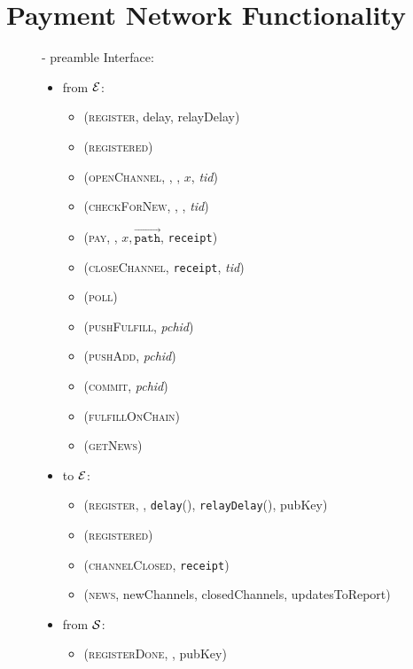 \section{Payment Network Functionality}
  \begin{figure}[H]
    \begin{systembox}{\fpaynet{} - preamble}
      Interface: 
      \begin{itemize}
        \item from $\mathcal{E}$:
        \begin{itemize}
          \item (\textsc{register}, delay, relayDelay)
          \item (\textsc{registered})
          \item (\textsc{openChannel}, \alice, \bob, $x$, \textit{tid})
          \item (\textsc{checkForNew}, \alice, \bob, \textit{tid})
          \item (\textsc{pay}, \bob, $x, \overrightarrow{\mathtt{path}}$,
          \texttt{receipt})
          \item (\textsc{closeChannel}, \texttt{receipt}, \textit{tid})
          \item (\textsc{poll})
          \item (\textsc{pushFulfill}, \textit{pchid})
          \item (\textsc{pushAdd}, \textit{pchid})
          \item (\textsc{commit}, \textit{pchid})
          \item (\textsc{fulfillOnChain})
          \item (\textsc{getNews})
        \end{itemize}
        \item to $\mathcal{E}$:
        \begin{itemize}
          \item (\textsc{register}, \alice, \texttt{delay}(\alice),
          \texttt{relayDelay}(\alice), pubKey)
          \item (\textsc{registered})
          \item (\textsc{channelClosed}, \texttt{receipt})
          \item (\textsc{news}, newChannels, closedChannels, updatesToReport)
        \end{itemize}
        \item from $\mathcal{S}$:
        \begin{itemize}
          \item (\textsc{registerDone}, \alice, pubKey)

\end{itemize}
\end{itemize}
\end{systembox}
\end{figure}
